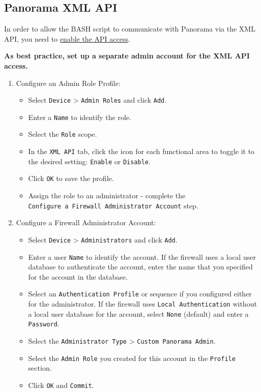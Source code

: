 \documentclass[
]{article}
\providecommand{\tightlist}{%
  \setlength{\itemsep}{0pt}\setlength{\parskip}{0pt}}
\begin{document}
\hypertarget{panorama-xml-api}{%
\subsection{Panorama XML API}\label{panorama-xml-api}}

In order to allow the BASH script to communicate with Panorama via the
XML API, you need to
\href{https://docs.paloaltonetworks.com/pan-os/10-2/pan-os-panorama-api/get-started-with-the-pan-os-xml-api/enable-api-access.html}{enable
the API access}.

\textbf{As best practice, set up a separate admin account for the XML
API access.}

\begin{enumerate}
\def\labelenumi{\arabic{enumi}.}
\item
  Configure an Admin Role Profile:

  \begin{itemize}
  \tightlist
  \item
    Select \texttt{Device} \textgreater{} \texttt{Admin\ Roles} and
    click \texttt{Add}.
  \item
    Enter a \texttt{Name} to identify the role.
  \item
    Select the \texttt{Role} scope.
  \item
    In the \texttt{XML\ API} tab, click the icon for each functional
    area to toggle it to the desired setting: \texttt{Enable} or
    \texttt{Disable}.
  \item
    Click \texttt{OK} to save the profile.
  \item
    Assign the role to an administrator - complete the
    \texttt{Configure\ a\ Firewall\ Administrator\ Account} step.
  \end{itemize}
\item
  Configure a Firewall Administrator Account:

  \begin{itemize}
  \tightlist
  \item
    Select \texttt{Device} \textgreater{} \texttt{Administrators} and
    click \texttt{Add}.
  \item
    Enter a user \texttt{Name} to identify the account. If the firewall
    uses a local user database to authenticate the account, enter the
    name that you specified for the account in the database.
  \item
    Select an \texttt{Authentication\ Profile} or sequence if you
    configured either for the administrator. If the firewall uses
    \texttt{Local\ Authentication} without a local user database for the
    account, select \texttt{None} (default) and enter a
    \texttt{Password}.
  \item
    Select the \texttt{Administrator\ Type} \textgreater{}
    \texttt{Custom\ Panorama\ Admin}.
  \item
    Select the \texttt{Admin\ Role} you created for this account in the
    \texttt{Profile} section.
  \item
    Click \texttt{OK} and \texttt{Commit}.
  \end{itemize}
\end{enumerate}
\end{document}
